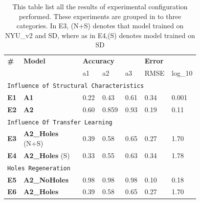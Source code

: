  
\begin{table}[h]
\begin{tabular}{p{0.05\linewidth}p{0.3\linewidth}p{0.1\linewidth}p{0.1\linewidth}p{0.08\linewidth}p{0.08\linewidth}p{0.07\linewidth}}
\hline
\textbf{\#} & \textbf{Model} & \multicolumn{3}{l}{\textbf{Accuracy}} & \multicolumn{2}{l}{\textbf{Error}} \\ \cline{3-7} 
                    &                        & a1       & a2       & a3      & RMSE         & log\_10      \\ \hline
\multicolumn{7}{l}{\texttt{Influence of Structural Characteristics}}                                            \\ \hline
\textbf{E1}                  &  \textbf{A1}  & 0.22         & 0.43          &  0.61       & 0.34            &   0.001           \\ \hline
\textbf{E2}                  & \textbf{A2}  &    0.60  & 0.859 & 0.93       &   0.19          &0.11              \\ \hline
\multicolumn{7}{l}{\texttt{Influence Of Transfer Learning}}                                                                   \\ \hline
\textbf{E3}                  & \textbf{A2\_Holes} (N+S)              & 0.39   & 0.58   & 0.65  & 0.27      & 1.70       \\ \hline
\textbf{E4}                  & \textbf{A2\_Holes} (S) & 0.33   & 0.55   & 0.63  & 0.34      & 1.78       \\ \hline
\multicolumn{7}{l}{\texttt{Holes Regeneration}}                                                       \\ \hline
\textbf{E5}                  & \textbf{A2\_NoHoles}            & 0.98   & 0.98   & 0.98  & 0.10       & 0.18        \\ \hline
\textbf{E6}                  & \textbf{A2\_Holes}              & 0.39   & 0.58   & 0.65  & 0.27      & 1.70       \\ \hline
\end{tabular}

\caption{This table list all the results of experimental configuration performed. These experiments are grouped in to three categories. In E3, (N+S) denotes that model trained on NYU\_v2 and SD, where as in E4,(S) denotes model trained on SD}
\label{table:Results_main}
\end{table}

